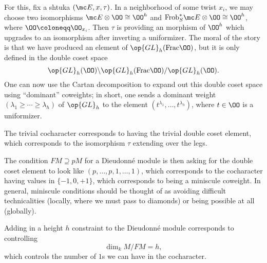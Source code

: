 \documentclass[../notes.tex]{subfiles}
\begin{document}
For this, fix a shtuka $(\mc E,x,\tau)$. In a neighborhood of some twist $x_i$, we may choose two isomorphisms $\mc E\otimes\OO\cong\OO^h$ and $\mathrm{Frob}_S^*\mc E\otimes\OO\cong\OO^h$, where $\OO\coloneqq\OO_{x_i}$. Then $\tau$ is providing an morphism of $\OO^h$ which upgrades to an isomorphism after inverting a uniformizer. The moral of the story is that we have produced an element of $\op{GL}_h(\mathrm{Frac}\OO)$, but it is only defined in the double coset space
\[\op{GL}_h(\OO)\backslash\op{GL}_h(\mathrm{Frac}\OO)/\op{GL}_h(\OO).\]
One can now use the Cartan decomposition to expand out this double coset space using ``dominant'' co\-weights; in short, one sends a dominant weight $(\lambda_1\ge\cdots\ge\lambda_h)$ of $\op{GL}_h$ to the element $(t^{\lambda_1},\ldots,t^{\lambda_h})$, where $t\in\OO$ is a uniformizer.
\begin{example}
	The trivial cocharacter corresponds to having the trivial double coset element, which corresponds to the isomorphism $\tau$ extending over the legs.
\end{example}
\begin{remark}
	The condition $FM\supseteq pM$ for a Dieudonn\'e module is then asking for the double coset element to look like $(p,\ldots,p,1,\ldots,1)$, which corresponds to the cocharacter having values in $\{-1,0,+1\}$, which corresponds to being a miniscule coweight. In general, miniscule conditions should be thought of as avoiding difficult technicalities (locally, where we must pass to diamonds) or being possible at all (globally).
\end{remark}
\begin{remark}
	Adding in a height $h$ constraint to the Dieudonn\'e module corresponds to controlling
	\[\dim_kM/FM=h,\]
	which controls the number of $1$s we can have in the cocharacter. %
\end{remark}
\end{document}
